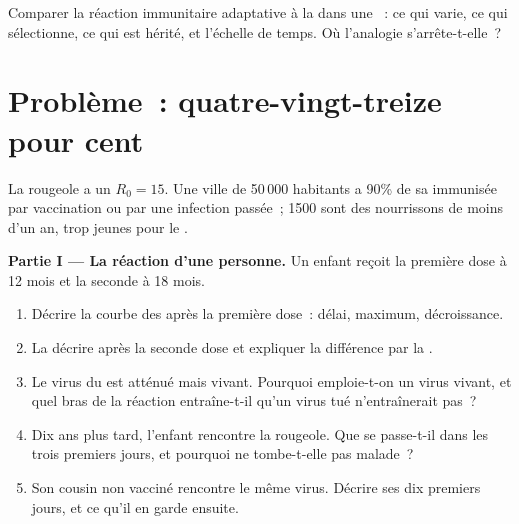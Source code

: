 \begin{exercise}[$\star\star\star$]\label{exo:g12:adaptive-immunity:15}
Comparer la réaction immunitaire adaptative à la 
dans une ~: ce qui varie, ce qui sélectionne, ce qui est
hérité, et l'échelle de temps. Où l'analogie s'arrête-t-elle~?
\end{exercise}

\section{Problème~: quatre-vingt-treize pour cent}

\begin{problem}
\label{pb:g12:adaptive-immunity:1}
La rougeole a un $R_0 = 15$. Une ville de 50\,000 habitants a 90\% de
sa  immunisée par vaccination ou par une infection passée~;
1500 sont des nourrissons de moins d'un an, trop jeunes pour le
.

\medskip
\noindent\textbf{Partie I --- La réaction d'une personne.}
Un enfant reçoit la première dose à 12 mois et la seconde à 18 mois.
\begin{enumerate}
  \item Décrire la courbe des  après la première dose~:
        délai, maximum, décroissance.
  \item La décrire après la seconde dose et expliquer la différence
        par la .
  \item Le virus du  est atténué mais vivant. Pourquoi
        emploie-t-on un virus vivant, et quel bras de la réaction
        entraîne-t-il qu'un virus tué n'entraînerait pas~?
  \item Dix ans plus tard, l'enfant rencontre la rougeole. Que se
        passe-t-il dans les trois premiers jours, et pourquoi ne
        tombe-t-elle pas malade~?
  \item Son cousin non vacciné rencontre le même virus. Décrire ses
        dix premiers jours, et ce qu'il en garde ensuite.
\end{enumerate}


\end{problem}
